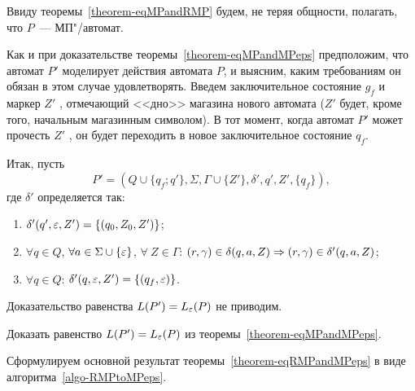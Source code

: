 \begin{myproof}
Ввиду теоремы~\ref{theorem-eqMPandRMP} будем, не теряя общности, полагать, что
$P$~--- МП"/автомат.

Как и при доказательстве теоремы~\ref{theorem-eqMPandMPeps} предположим, что автомат $P'$ моделирует действия автомата $P$, и выясним, каким требованиям он обязан в этом случае удовлетворять. Введем заключительное состояние $g_f$ и маркер $Z'$ , отмечающий <<дно>> магазина нового автомата ($Z'$ будет, кроме того, начальным магазинным символом). В тот момент, когда автомат $P'$ может прочесть $Z'$ , он будет переходить в новое заключительное состояние $q_f$.

Итак, пусть
\[
P' = (Q\cup\{q_f;q'\},\Sigma,\Gamma\cup\{Z'\},\delta' ,q' ,Z' ,\{q_f\}),
\]
где $\delta'$ определяется так:
\begin{enumerate}
    \item $\delta' (q',\varepsilon,Z')=\{(q_0,Z_0,Z')\}$;

    \item $\forall q\in Q$, $\forall a\in\Sigma\cup\{\varepsilon\}$,
    $\forall\ Z\in\Gamma$:
        $(r,\gamma)\in\delta(q,a,Z)\Rightarrow(r,\gamma)\in\delta'(q,a,Z)$;

    \item $\forall q\in Q$: $\delta'(q,\varepsilon,Z')=\{(q_f,\varepsilon)\}$.
\end{enumerate}

Доказательство равенства $L(P')=L_\varepsilon(P)$ не приводим.
\end{myproof}

\begin{myproblem}
Доказать равенство $L(P')=L_\varepsilon(P)$ из теоремы~\ref{theorem-eqMPandMPeps}.
\end{myproblem}

Сформулируем основной результат теоремы~\ref{theorem-eqRMPandMPeps} в виде алгоритма~\ref{algo-RMPtoMPeps}.


